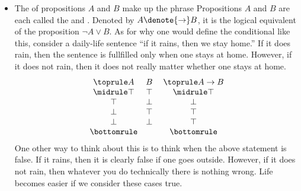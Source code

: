 \begin{itemize}
    \item The  of propositions \(A\) and \(B\)
    make up the phrase 
    Propositions \(A\) and \(B\) are each called
    the  and .
    Denoted by \(A\denote{\to}B\),
    it is the logical equivalent of the proposition
    \(\neg A\vee B\).
    As for why one would define the conditional like this,
    consider a daily-life sentence ``if it rains, then we stay home.''
    If it does rain,
    then the sentence is fullfilled only when one stays at home.
    However, if it does not rain,
    then it does not really matter whether one stays at home.
    \[
        \begin{array}{c c}\toprule
            A & B \\ \midrule
            \top & \top \\
            \top & \bot \\
            \bot & \top \\
            \bot & \bot \\ \bottomrule
        \end{array}
        \;
        \begin{array}{c}\toprule
            A\to B \\ \midrule
            \top \\
            \bot \\
            \top \\
            \top \\ \bottomrule
        \end{array}
    \]
    One other way to think about this is
    to think when the above statement is false.
    If it rains, then it is clearly false if one goes outside.
    However, if it does not rain,
    then whatever you do technically there is nothing wrong.
    Life becomes easier if we consider these cases true.


\end{itemize}

